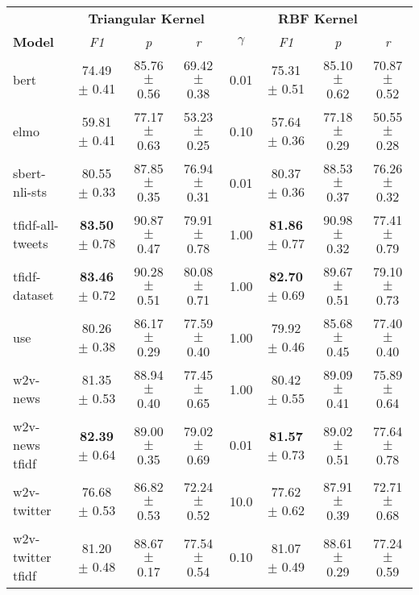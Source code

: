 \begin{tabular}{|l|ccc|cccc|}
\hline
                           &\multicolumn{3}{c}{\textbf{Triangular Kernel}}&\multicolumn{4}{|c|}{\textbf{RBF Kernel}}\\
\cline{2-8}    \textbf{Model} &       \textit{F1} &        \textit{p} &        \textit{r} & $\gamma$ &       \textit{F1} &        \textit{p} &        \textit{r} \\
\hline
             bert  &  74.49 $\pm$ 0.41 &  85.76 $\pm$ 0.56 &  69.42 $\pm$ 0.38 &     0.01 &  75.31 $\pm$ 0.51 &  85.10 $\pm$ 0.62 &  70.87 $\pm$ 0.52 \\
             elmo  &  59.81 $\pm$ 0.41 &  77.17 $\pm$ 0.63 &  53.23 $\pm$ 0.25 &     0.10 &  57.64 $\pm$ 0.36 &  77.18 $\pm$ 0.29 &  50.55 $\pm$ 0.28 \\
    sbert-nli-sts  &  80.55 $\pm$ 0.33 &  87.85 $\pm$ 0.35 &  76.94 $\pm$ 0.31 &     0.01 &  80.37 $\pm$ 0.36 &  88.53 $\pm$ 0.37 &  76.26 $\pm$ 0.32 \\
 tfidf-all-tweets  &\textbf{83.50} $\pm$ 0.78 &  90.87 $\pm$ 0.47 &  79.91 $\pm$ 0.78 &     1.00 &\textbf{81.86} $\pm$ 0.77 &  90.98 $\pm$ 0.32 &  77.41 $\pm$ 0.79 \\
    tfidf-dataset  &\textbf{83.46} $\pm$ 0.72 &  90.28 $\pm$ 0.51 &  80.08 $\pm$ 0.71 &     1.00 &\textbf{82.70} $\pm$ 0.69 &  89.67 $\pm$ 0.51 &  79.10 $\pm$ 0.73 \\
              use  &  80.26 $\pm$ 0.38 &  86.17 $\pm$ 0.29 &  77.59 $\pm$ 0.40 &     1.00 &  79.92 $\pm$ 0.46 & 85.68 $\pm$ 0.45 &  77.40 $\pm$ 0.40 \\
         w2v-news  &  81.35 $\pm$ 0.53 &  88.94 $\pm$ 0.40 &  77.45 $\pm$ 0.65 &     1.00 &  80.42 $\pm$ 0.55 & 89.09 $\pm$ 0.41 &  75.89 $\pm$ 0.64 \\
    w2v-news tfidf &\textbf{82.39} $\pm$ 0.64 &  89.00 $\pm$ 0.35 &  79.02 $\pm$ 0.69 &     0.01 &\textbf{81.57} $\pm$ 0.73 &  89.02 $\pm$ 0.51 &  77.64 $\pm$ 0.78 \\
      w2v-twitter  &  76.68 $\pm$ 0.53 &  86.82 $\pm$ 0.53 &  72.24 $\pm$ 0.52 &     10.0 &  77.62 $\pm$ 0.62 &  87.91 $\pm$ 0.39 &  72.71 $\pm$ 0.68 \\
 w2v-twitter tfidf &  81.20 $\pm$ 0.48 &  88.67 $\pm$ 0.17 &  77.54 $\pm$ 0.54 &     0.10 &  81.07 $\pm$ 0.49 &  88.61 $\pm$ 0.29 &  77.24 $\pm$ 0.59 \\
\hline
\end{tabular}
